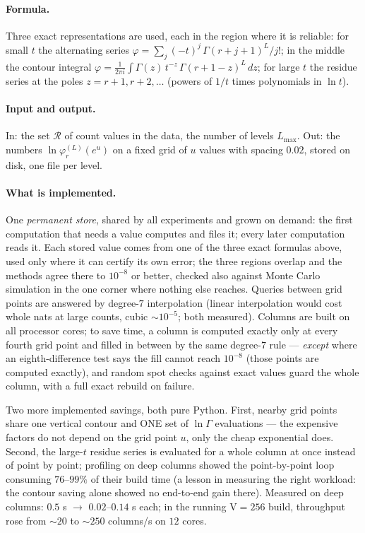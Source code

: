 \documentclass[11pt]{article}
\newcommand{\field}[1]{\paragraph{#1.}}
\begin{document}
\field{Formula}
Three exact representations are used, each in the region where it is
reliable: for small $t$ the alternating series
$\varphi = \sum_j (-t)^j\, \Gamma(r{+}j{+}1)^L / j!$; in the middle
the contour integral
$\varphi = \frac{1}{2\pi i}\int \Gamma(z)\, t^{-z}\,
\Gamma(r{+}1{-}z)^L\, dz$; for large $t$ the residue series at the
poles $z = r{+}1, r{+}2, \dots$ (powers of $1/t$ times polynomials
in $\ln t$).

\field{Input and output}
In: the set $\mathcal{R}$ of count values in the data, the number of
levels $L_{\max}$.  Out: the numbers
$\ln \varphi^{(L)}_r(e^{u})$ on a fixed grid of $u$ values with
spacing $0.02$, stored on disk, one file per level.

\field{What is implemented}
One \emph{permanent store}, shared by all experiments and grown on
demand: the first computation that needs a value computes and files
it; every later computation reads it.  Each stored value comes from
one of the three exact formulas above, used only where it can
certify its own error; the three regions overlap and the methods
agree there to $10^{-8}$ or better, checked also against Monte Carlo
simulation in the one corner where nothing else reaches.  Queries
between grid points are answered by degree-$7$ interpolation (linear
interpolation would cost whole nats at large counts, cubic
$\sim 10^{-5}$; both measured).  Columns are built on all processor
cores; to save time, a column is computed exactly only at every
fourth grid point and filled in between by the same degree-$7$ rule
--- \emph{except} where an eighth-difference test says the fill
cannot reach $10^{-8}$ (those points are computed exactly), and
random spot checks against exact values guard the whole column, with
a full exact rebuild on failure.

Two more implemented savings, both pure Python.  First, nearby grid
points share one vertical contour and ONE set of $\ln\Gamma$
evaluations --- the expensive factors do not depend on the grid point
$u$, only the cheap exponential does.  Second, the large-$t$ residue
series is evaluated for a whole column at once instead of point by
point; profiling on deep columns showed the point-by-point loop
consuming $76$--$99\%$ of their build time (a lesson in measuring
the right workload: the contour saving alone showed no end-to-end
gain there).  Measured on deep columns: $0.5$ s $\to$
$0.02$--$0.14$ s each; in the running V$=256$ build, throughput rose
from $\sim 20$ to $\sim 250$ columns/s on $12$ cores.
\end{document}

